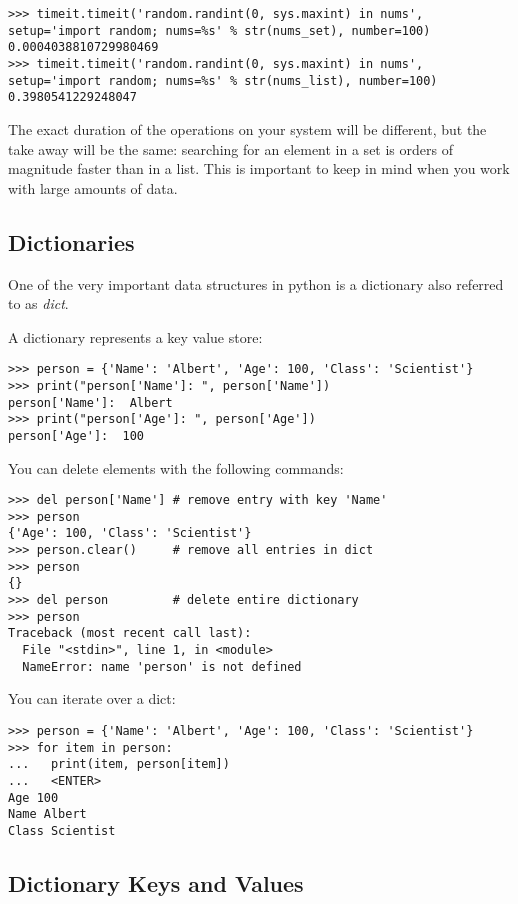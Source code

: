 \begin{verbatim}
>>> timeit.timeit('random.randint(0, sys.maxint) in nums', setup='import random; nums=%s' % str(nums_set), number=100)
0.0004038810729980469
>>> timeit.timeit('random.randint(0, sys.maxint) in nums', setup='import random; nums=%s' % str(nums_list), number=100)
0.3980541229248047
\end{verbatim}

The exact duration of the operations on your system will be different,
but the take away will be the same: searching for an element in a set is
orders of magnitude faster than in a list. This is important to keep in
mind when you work with large amounts of data.

\subsection{Dictionaries}\label{dictionaries}

One of the very important data structures in python is a dictionary also
referred to as \emph{dict}.

A dictionary represents a key value store:

\begin{verbatim}
>>> person = {'Name': 'Albert', 'Age': 100, 'Class': 'Scientist'}
>>> print("person['Name']: ", person['Name'])
person['Name']:  Albert
>>> print("person['Age']: ", person['Age'])
person['Age']:  100
\end{verbatim}

You can delete elements with the following commands:

\begin{verbatim}
>>> del person['Name'] # remove entry with key 'Name'
>>> person
{'Age': 100, 'Class': 'Scientist'}
>>> person.clear()     # remove all entries in dict
>>> person
{}
>>> del person         # delete entire dictionary
>>> person
Traceback (most recent call last):
  File "<stdin>", line 1, in <module>
  NameError: name 'person' is not defined
\end{verbatim}

You can iterate over a dict:

\begin{verbatim}
>>> person = {'Name': 'Albert', 'Age': 100, 'Class': 'Scientist'}
>>> for item in person:
...   print(item, person[item])
...   <ENTER>
Age 100
Name Albert
Class Scientist
\end{verbatim}

\subsection{Dictionary Keys and
Values}\label{dictionary-keys-and-values}

